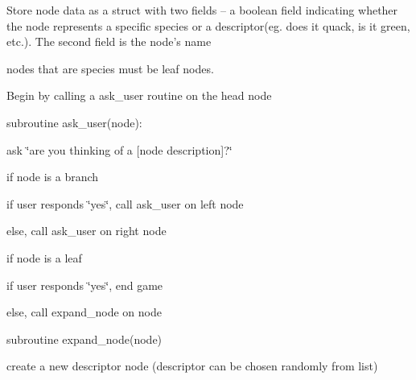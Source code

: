\begin{DoxyItemize}
\item Store node data as a struct with two fields -- a boolean field indicating whether the node represents a specific species or a descriptor(eg. does it quack, is it green, etc.). The second field is the node's name
\begin{DoxyItemize}
\item nodes that are species must be leaf nodes.
\end{DoxyItemize}
\item Begin by calling a {\ttfamily ask\+\_\+user} routine on the head node
\item subroutine {\ttfamily ask\+\_\+user(node)}\+:
\begin{DoxyItemize}
\item ask \char`\"{}are you thinking of a \mbox{[}node description\mbox{]}?\char`\"{}
\item if node is a branch
\begin{DoxyItemize}
\item if user responds \char`\"{}yes\char`\"{}, call ask\+\_\+user on left node
\item else, call {\ttfamily ask\+\_\+user} on right node
\end{DoxyItemize}
\item if node is a leaf
\begin{DoxyItemize}
\item if user responds \char`\"{}yes\char`\"{}, end game
\item else, call {\ttfamily expand\+\_\+node} on node
\end{DoxyItemize}
\end{DoxyItemize}
\item subroutine {\ttfamily expand\+\_\+node(node)}
\begin{DoxyItemize}
\item create a new descriptor node (descriptor can be chosen randomly from list)
\item 
\end{DoxyItemize}
\end{DoxyItemize}